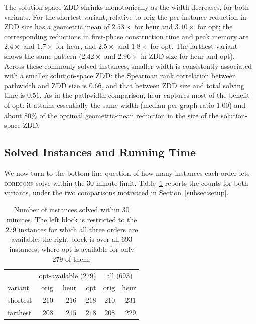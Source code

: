 \documentclass[conference]{IEEEtran}
\newcommand{\OrigDecom}{\textsf{orig}\xspace}
\newcommand{\HeurDecom}{\textsf{heur}\xspace}
\newcommand{\OptDecom}{\textsf{opt}\xspace}
\begin{document}
The solution-space ZDD shrinks monotonically as the width decreases, for both
variants.
For the shortest variant, relative to \OrigDecom the per-instance reduction in
ZDD size has a geometric mean of $2.53\times$ for \HeurDecom and $3.10\times$ for
\OptDecom; the corresponding reductions in first-phase construction time and peak
memory are $2.4\times$ and $1.7\times$ for \HeurDecom, and $2.5\times$ and
$1.8\times$ for \OptDecom. The farthest variant shows the same pattern
($2.42\times$ and $2.96\times$ in ZDD size for \HeurDecom and \OptDecom).
Across these commonly solved instances, smaller width is consistently associated
with a smaller solution-space ZDD: the Spearman rank correlation between
pathwidth and ZDD size is $0.66$, and that between ZDD size and total solving
time is $0.51$.
As in the pathwidth comparison, \HeurDecom captures most of the benefit of
\OptDecom: it attains essentially the same width (median per-graph ratio $1.00$)
and about $80\%$ of the optimal geometric-mean reduction in the size of the
solution-space ZDD.
 
\subsection{Solved Instances and Running Time}
\label{subsec:solved}
 
We now turn to the bottom-line question of how many instances each order lets
\textsc{ddreconf} solve within the $30$-minute limit.
Table~\ref{tab:solved} reports the counts for both variants, under the two
comparisons motivated in Section~\ref{subsec:setup}.
 
\begin{table}[t]
  \centering
  \caption{Number of instances solved within $30$ minutes. The left block is
  restricted to the $279$ instances for which all three orders are available; the
  right block is over all $693$ instances, where \OptDecom is available for only
  $279$ of them.}
  \label{tab:solved}
  \begin{tabular}{lrrr|rr}
    \hline
    & \multicolumn{3}{c|}{opt-available ($279$)} & \multicolumn{2}{c}{all ($693$)} \\
    variant & \OrigDecom & \HeurDecom & \OptDecom & \OrigDecom & \HeurDecom \\
    \hline
    shortest & $210$ & $216$ & $218$ & $210$ & $231$ \\
    farthest & $208$ & $215$ & $218$ & $208$ & $229$ \\
    \hline
  \end{tabular}
\end{table}
 
\end{document}
